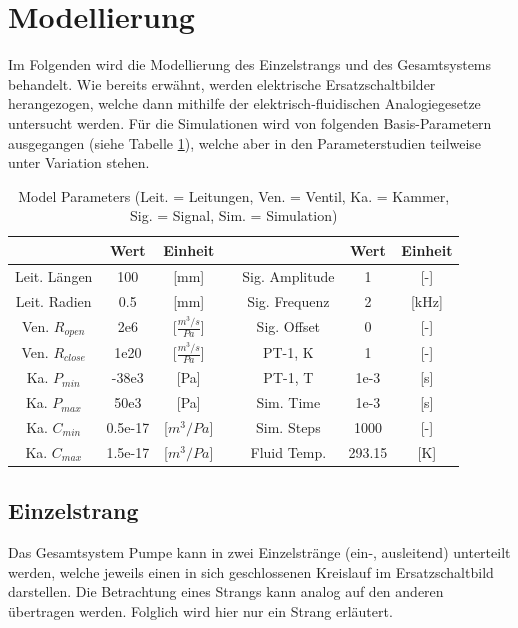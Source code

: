 \documentclass[fontsize=12pt, a4paper]{scrartcl}
\begin{document}
\section{Modellierung}

Im Folgenden wird die Modellierung des Einzelstrangs und des Gesamtsystems behandelt. Wie bereits erwähnt, werden elektrische Ersatzschaltbilder herangezogen, welche dann mithilfe der elektrisch-fluidischen Analogiegesetze untersucht werden. Für die Simulationen wird von folgenden Basis-Parametern ausgegangen (siehe Tabelle \ref{tab:modelparameters}), welche aber in den Parameterstudien teilweise unter Variation stehen.

\begin{table}[H]
\begin{tabular}[h]{c|c|c|c|c|c|c}
	  & Wert & Einheit & & & Wert & Einheit\\
	\hline
	Leit. Längen & 100 & [mm] & & Sig. Amplitude & 1 & [-] \\
	Leit. Radien & 0.5 & [mm] & & Sig. Frequenz & 2 & [kHz] \\
	Ven. $R_{open}$ & 2e6 & [$\frac{m^3/s}{Pa}$] & & Sig. Offset & 0 & [-] \\
	Ven. $R_{close}$ & 1e20 & [$\frac{m^3/s}{Pa}$] & & PT-1, K & 1 & [-] \\
	Ka. $P_{min}$ & -38e3 & [Pa] & & PT-1, T & 1e-3 & [s] \\
	Ka. $P_{max}$ & 50e3 & [Pa] & & Sim. Time & 1e-3 & [s] \\
	Ka. $C_{min}$ & 0.5e-17 & [$m^3/Pa$] & & Sim. Steps & 1000 & [-] \\
	Ka. $C_{max}$ & 1.5e-17 & [$m^3/Pa$] & & Fluid Temp. & 293.15 & [K]
\end{tabular}
\caption{\label{tab:modelparameters} Model Parameters (Leit. = Leitungen, Ven. = Ventil, Ka. = Kammer, Sig. = Signal, Sim. = Simulation)}
\end{table}

\newpage

\subsection{Einzelstrang}

Das Gesamtsystem Pumpe kann in zwei Einzelstränge (ein-, ausleitend) unterteilt werden, welche jeweils einen in sich geschlossenen Kreislauf im Ersatzschaltbild darstellen.
Die Betrachtung eines Strangs kann analog auf den anderen übertragen werden. Folglich wird hier nur ein Strang erläutert.
\end{document}
